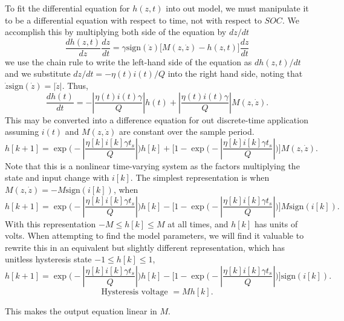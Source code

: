 \documentclass[11pt,a4paper]{article}
\numberwithin{equation}{section}
\newcommand{\abs}[1]{\left|#1\right|}
\newcommand{\sign}{\text{sign}}
\theoremstyle{it}
\theoremstyle{definition}
\begin{document}
To fit the differential equation for $h(z,t)$ into out model, we must manipulate it to be a differential equation with respect to time, not with respect to $SOC$. We accomplish this by multiplying both side of the equation by $dz/dt$
\begin{equation}
	\frac{dh(z,t)}{dz}\frac{dz}{dt}=\gamma\sign(\dot{z})\Big[M(z,\dot{z})-h(z,t)\Big]\frac{dz}{dt}
\end{equation} 
we use the chain rule to write the left-hand side of the equation as $dh(z,t)/dt$ and we substitute $dz/dt = -\eta(t)i(t)/Q$ into the right hand side, noting that $\dot{z}\sign(\dot{z})=\abs{\dot{z}}$. Thus,
\begin{equation}
	\frac{dh(t)}{dt} = -\abs{\frac{\eta(t)i(t)\gamma}{Q}}h(t)+\abs{\frac{\eta(t)i(t)\gamma}{Q}}M(z,\dot{z}).
\end{equation}
This may be converted into a difference equation for out discrete-time application assuming $i(t)$ and $M(z,\dot{z})$ are constant over the sample period. 
\begin{equation}
h[k+1] = \exp\Bigg(-\abs{\frac{\eta[k]i[k]\gamma t_s}{Q}}\Bigg)h[k] + \Bigg[1-\exp\Bigg(-\abs{\frac{\eta[k]i[k]\gamma t_s}{Q}}\Bigg)\Bigg]M(z,\dot{z}).
\end{equation}
Note that this is a nonlinear time-varying system as the factors multiplying the state and input change with $i[k]$.
The simplest representation is when $M(z,\dot{z})=-M\sign(i[k])$, when 
 \begin{equation}
 	h[k+1] = \exp\Bigg(-\abs{\frac{\eta[k]i[k]\gamma t_s}{Q}}\Bigg)h[k] - \Bigg[1-\exp\Bigg(-\abs{\frac{\eta[k]i[k]\gamma t_s}{Q}}\Bigg)\Bigg]M\sign(i[k]).
 \end{equation}
With this representation $-M\le h[k] \le M$ at all times, and $h[k]$ has units of volts. When attempting to find the model parameters, we will find it valuable to rewrite this in an equivalent but slightly different representation, which has unitless hysteresis state $-1 \le h[k] \le 1$,
 \begin{equation}
	h[k+1] = \exp\Bigg(-\abs{\frac{\eta[k]i[k]\gamma t_s}{Q}}\Bigg)h[k] - \Bigg[1-\exp\Bigg(-\abs{\frac{\eta[k]i[k]\gamma t_s}{Q}}\Bigg)\Bigg]\sign(i[k]).
\end{equation}
\begin{equation}
\text{Hysteresis voltage } = Mh[k].
\end{equation}


This makes the output equation linear in $M$.
\end{document}
